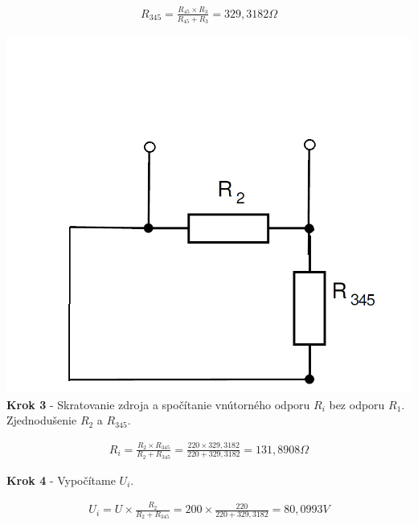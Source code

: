 \begin{gather*}
R_{345}=\frac{R_{45} \times R_{3}}{R_{45}+R_{3}}=329,3182\Omega 
\end{gather*}


\begin{center}
\includegraphics[scale=0.5,keepaspectratio]{fig/obr/Pr2_3.png} \\
\textbf{Krok 3} - Skratovanie zdroja a spočítanie vnútorného odporu $R_{i}$ bez odporu $R_{1}$. Zjednodušenie $R_{2}$ a $R_{345}$.
\end{center}

\begin{gather*}
R_{i}=\frac{R_{2} \times R_{345}}{R_{2}+R_{345}}=\frac{220 \times 329,3182}{220+329,3182}=131,8908\Omega 
\end{gather*}

\begin{center}
\textbf{Krok 4} - Vypočítame $U_{i}$.
\end{center}

\begin{gather*}
U_{i}=U \times \frac{R_{2}}{R_{2}+R_{345}}=200 \times \frac{220}{220+329,3182}=80,0993V 
\end{gather*}


